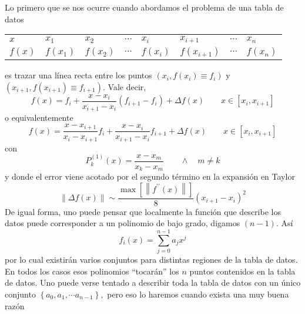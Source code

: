 \documentclass[spanish,titlepage,11pt]{article}
\begin{document}
Lo primero que se nos ocurre cuando abordamos el problema de una tabla de datos

\begin{center}%
\begin{tabular}
[c]{llllllll}%
$x$ & $x_{1}$ & $x_{2}$ & $\cdots$ & $x_{i}$ & $x_{i+1}$ & $\cdots$ & $x_{n}%
$\\
$f\left(  x\right)  $ & $f\left(  x_{1}\right)  $ & $f\left(  x_{2}\right)  $%
& $\cdots$ & $f\left(  x_{i}\right)  $ & $f\left(  x_{i+1}\right)  $ &
$\cdots$ & $f\left(  x_{n}\right)  $%
\end{tabular}
\end{center}

es trazar una l\'{i}nea recta entre los puntos $\left(  x_{i},f\left(
x_{i}\right)  \equiv f_{i}\right)  $ y $\left(  x_{i+1},f\left(
x_{i+1}\right)  \equiv f_{i+1}\right)  .$ Vale decir,
\begin{equation}
f(x)=f_{i}+\frac{x-x_{i}}{x_{i+1}-x_{i}}\left(  f_{i+1}-f_{i}\right)  +\Delta
f(x)\qquad x\in\left[  x_{i},x_{i+1}\right]
\end{equation}
o equivalentemente
\begin{equation}
f(x)=\frac{x-x_{i+1}}{x_{i}-x_{i+1}}f_{i}+\frac{x-x_{i}}{x_{i+1}-x_{i}}%
f_{i+1}+\Delta f(x)\qquad x\in\left[  x_{i},x_{i+1}\right]  \label{lineal}%
\end{equation}
con
\begin{equation}
P_{k}^{(1)}(x)=\frac{x-x_{m}}{x_{k}-x_{m}}\qquad\wedge\quad m\neq k
\end{equation}
y donde el error viene acotado por el segundo t\'{e}rmino en la expansi\'{o}n
en Taylor
\begin{equation}
\left\|  \Delta f(x)\right\|  \sim\frac{\max\left[  \left\|  f^{\prime\prime
}(x)\right\|  \right]  }{8}\left(  x_{i+1}-x_{i}\right)  ^{2}%
\end{equation}
De igual forma, uno puede pensar que localmente la funci\'{o}n que describe
los datos puede corresponder a un polinomio de bajo grado, digamos $\left(
n-1\right)  $. As\'{i}
\begin{equation}
f_{i}(x)=\sum_{j=0}^{n-1}a_{j}x^{j}%
\end{equation}
por lo cual existir\'{a}n varios conjuntos para distintas regiones de la tabla
de datos. En todos los casos esos polinomios ``tocar\'{a}n'' los $n$ puntos
contenidos en la tabla de datos. Uno puede verse tentado a describir toda la
tabla de datos con un \'{u}nico conjunto $\left\{  a_{0},a_{1},\cdots
a_{n-1}\right\}  ,$ pero eso lo haremos cuando exista una muy buena raz\'{o}n
\end{document}

